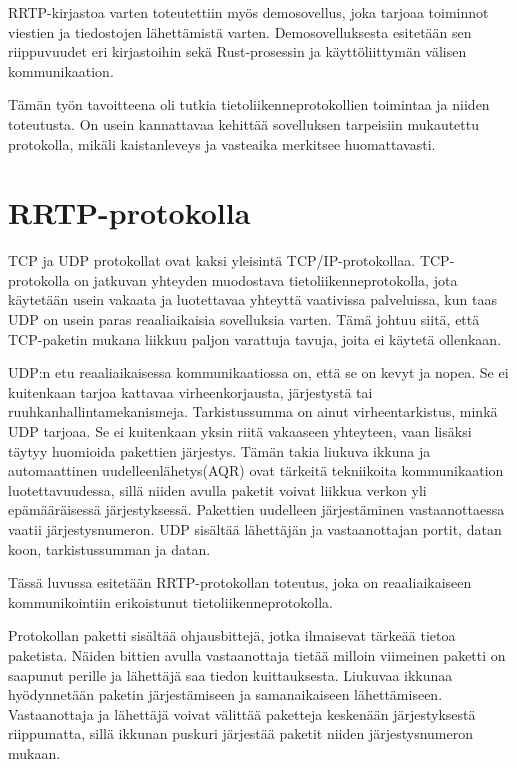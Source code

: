 \documentclass[a4paper,12pt]{article}
\begin{document}
    RRTP-kirjastoa varten toteutettiin myös demosovellus, joka tarjoaa 
    toiminnot viestien ja tiedostojen lähettämistä varten. Demosovelluksesta esitetään sen riippuvuudet eri kirjastoihin sekä Rust-prosessin ja 
    käyttöliittymän välisen kommunikaation. \par

    Tämän työn tavoitteena oli tutkia tietoliikenneprotokollien toimintaa ja niiden toteutusta. On usein kannattavaa kehittää sovelluksen tarpeisiin mukautettu protokolla, mikäli kaistanleveys ja vasteaika merkitsee huomattavasti.

   \section{RRTP-protokolla}\label{sec:protocol}
    TCP ja UDP protokollat ovat kaksi yleisintä TCP/IP-protokollaa. TCP-protokolla on jatkuvan yhteyden muodostava tietoliikenneprotokolla, jota käytetään usein vakaata ja luotettavaa yhteyttä vaativissa palveluissa, kun taas UDP on usein paras reaaliaikaisia sovelluksia varten. Tämä johtuu siitä, että TCP-paketin mukana liikkuu paljon varattuja tavuja, joita ei käytetä ollenkaan.\par
    
    UDP:n etu reaaliaikaisessa kommunikaatiossa on, että se on kevyt ja nopea. Se ei kuitenkaan tarjoa kattavaa virheenkorjausta, järjestystä tai ruuhkanhallintamekanismeja. Tarkistussumma on ainut virheentarkistus, minkä UDP tarjoaa. Se ei kuitenkaan yksin riitä vakaaseen yhteyteen, vaan lisäksi täytyy huomioida pakettien järjestys. Tämän takia liukuva ikkuna ja automaattinen uudelleenlähetys(AQR) ovat tärkeitä tekniikoita kommunikaation luotettavuudessa, sillä niiden avulla paketit voivat liikkua verkon yli epämääräisessä järjestyksessä. Pakettien uudelleen järjestäminen vastaanottaessa vaatii järjestysnumeron. UDP sisältää
    lähettäjän ja vastaanottajan portit, datan koon, tarkistussumman ja datan.
    \cite{KumarSurveyUDP}
    \par
   
    Tässä luvussa esitetään RRTP-protokollan toteutus, joka on reaaliaikaiseen kommunikointiin erikoistunut tietoliikenneprotokolla.\par

    Protokollan paketti sisältää ohjausbittejä, jotka ilmaisevat tärkeää tietoa paketista. Näiden bittien avulla vastaanottaja tietää milloin viimeinen paketti on saapunut perille ja lähettäjä saa tiedon kuittauksesta. 
    Liukuvaa ikkunaa hyödynnetään paketin järjestämiseen ja samanaikaiseen lähettämiseen.
    Vastaanottaja ja lähettäjä voivat välittää paketteja keskenään järjestyksestä riippumatta, sillä ikkunan puskuri järjestää paketit niiden järjestysnumeron mukaan.
\end{document}
